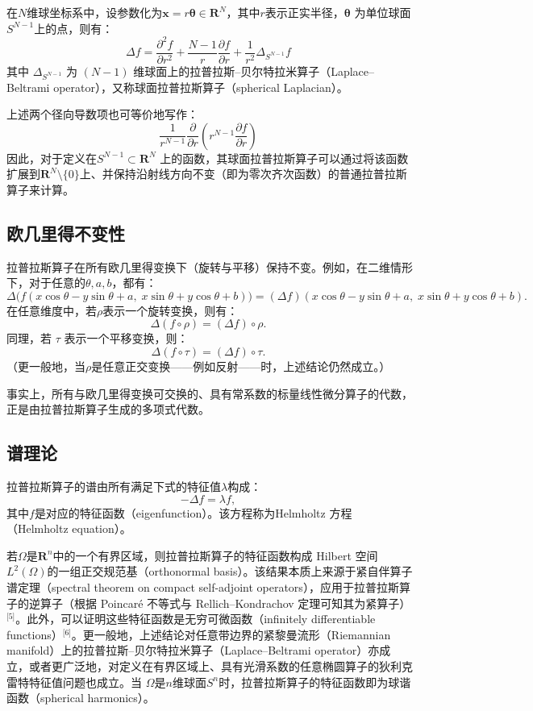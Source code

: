 在$N$维球坐标系中，设参数化为$\mathbf{x} = r \boldsymbol{\theta} \in \mathbf{R}^{N}$，其中$r$表示正实半径，$\boldsymbol{\theta}$ 为单位球面 $S^{N-1}$上的点，则有：
\[
\Delta f
= \frac{\partial^{2} f}{\partial r^{2}}
+ \frac{N - 1}{r} \frac{\partial f}{\partial r}
+ \frac{1}{r^{2}} \Delta_{S^{N-1}} f~
\]
其中 $\Delta_{S^{N-1}}$ 为 $(N - 1)$ 维球面上的拉普拉斯–贝尔特拉米算子（Laplace–Beltrami operator），又称球面拉普拉斯算子（spherical Laplacian）。

上述两个径向导数项也可等价地写作：
\[
\frac{1}{r^{N-1}}
\frac{\partial}{\partial r}
\left(
  r^{N-1} \frac{\partial f}{\partial r}
\right)~
\]
因此，对于定义在$S^{N-1} \subset \mathbf{R}^{N}$ 上的函数，其球面拉普拉斯算子可以通过将该函数扩展到$\mathbf{R}^{N} \setminus \{0\}$上、并保持沿射线方向不变（即为零次齐次函数）的普通拉普拉斯算子来计算。
\subsection{欧几里得不变性}
拉普拉斯算子在所有欧几里得变换下（旋转与平移）保持不变。例如，在二维情形下，对于任意的$\theta, a, b$，都有：
\[
\Delta \bigl( f(x \cos \theta - y \sin \theta + a,\;
x \sin \theta + y \cos \theta + b) \bigr)
= (\Delta f)(x \cos \theta - y \sin \theta + a,\;
x \sin \theta + y \cos \theta + b).~
\]
在任意维度中，若$\rho$表示一个旋转变换，则有：
\[
\Delta (f \circ \rho) = (\Delta f) \circ \rho.~
\]
同理，若 $\tau$ 表示一个平移变换，则：
\[
\Delta (f \circ \tau) = (\Delta f) \circ \tau.~
\]
（更一般地，当$\rho$是任意正交变换——例如反射——时，上述结论仍然成立。）

事实上，所有与欧几里得变换可交换的、具有常系数的标量线性微分算子的代数，
正是由拉普拉斯算子生成的多项式代数。
\subsection{谱理论}
拉普拉斯算子的谱由所有满足下式的特征值$\lambda$构成：
\[
- \Delta f = \lambda f,~
\]
其中$f$是对应的特征函数（eigenfunction）。该方程称为Helmholtz 方程（Helmholtz equation）。

若$\Omega$是$\mathbf{R}^{n}$中的一个有界区域，则拉普拉斯算子的特征函数构成 Hilbert 空间$L^{2}(\Omega)$的一组正交规范基（orthonormal basis）。该结果本质上来源于紧自伴算子谱定理（spectral theorem on compact self-adjoint operators），应用于拉普拉斯算子的逆算子（根据 Poincaré 不等式与 Rellich–Kondrachov 定理可知其为紧算子）\(^\text{[5]}\)。此外，可以证明这些特征函数是无穷可微函数（infinitely differentiable functions）\(^\text{[6]}\)。更一般地，上述结论对任意带边界的紧黎曼流形（Riemannian manifold）上的拉普拉斯–贝尔特拉米算子（Laplace–Beltrami operator）亦成立，或者更广泛地，对定义在有界区域上、具有光滑系数的任意椭圆算子的狄利克雷特特征值问题也成立。当 $\Omega$是$n$维球面$S^{n}$时，拉普拉斯算子的特征函数即为球谐函数（spherical harmonics）。
